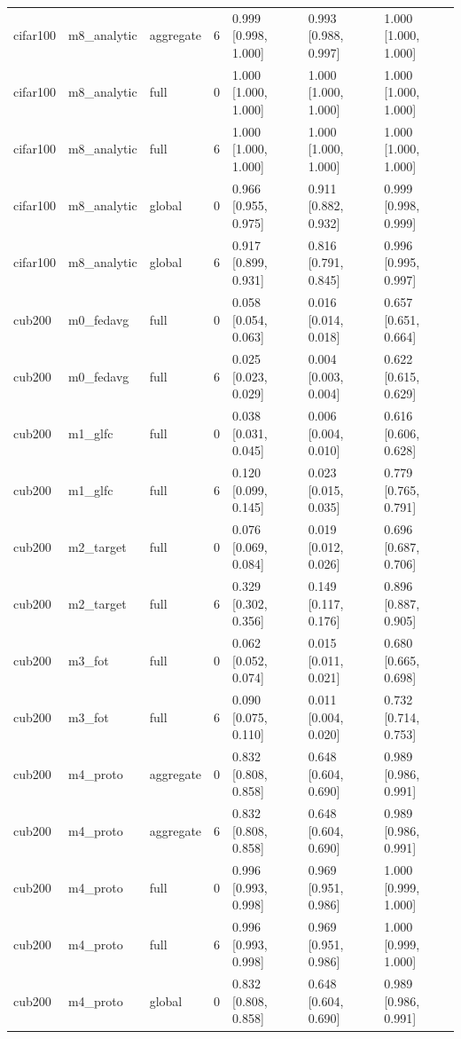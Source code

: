 \begin{tabular}{lllrlll}
cifar100 & m8\_analytic & aggregate & 6 & 0.999 [0.998, 1.000] & 0.993 [0.988, 0.997] & 1.000 [1.000, 1.000] \\
cifar100 & m8\_analytic & full & 0 & 1.000 [1.000, 1.000] & 1.000 [1.000, 1.000] & 1.000 [1.000, 1.000] \\
cifar100 & m8\_analytic & full & 6 & 1.000 [1.000, 1.000] & 1.000 [1.000, 1.000] & 1.000 [1.000, 1.000] \\
cifar100 & m8\_analytic & global & 0 & 0.966 [0.955, 0.975] & 0.911 [0.882, 0.932] & 0.999 [0.998, 0.999] \\
cifar100 & m8\_analytic & global & 6 & 0.917 [0.899, 0.931] & 0.816 [0.791, 0.845] & 0.996 [0.995, 0.997] \\
cub200 & m0\_fedavg & full & 0 & 0.058 [0.054, 0.063] & 0.016 [0.014, 0.018] & 0.657 [0.651, 0.664] \\
cub200 & m0\_fedavg & full & 6 & 0.025 [0.023, 0.029] & 0.004 [0.003, 0.004] & 0.622 [0.615, 0.629] \\
cub200 & m1\_glfc & full & 0 & 0.038 [0.031, 0.045] & 0.006 [0.004, 0.010] & 0.616 [0.606, 0.628] \\
cub200 & m1\_glfc & full & 6 & 0.120 [0.099, 0.145] & 0.023 [0.015, 0.035] & 0.779 [0.765, 0.791] \\
cub200 & m2\_target & full & 0 & 0.076 [0.069, 0.084] & 0.019 [0.012, 0.026] & 0.696 [0.687, 0.706] \\
cub200 & m2\_target & full & 6 & 0.329 [0.302, 0.356] & 0.149 [0.117, 0.176] & 0.896 [0.887, 0.905] \\
cub200 & m3\_fot & full & 0 & 0.062 [0.052, 0.074] & 0.015 [0.011, 0.021] & 0.680 [0.665, 0.698] \\
cub200 & m3\_fot & full & 6 & 0.090 [0.075, 0.110] & 0.011 [0.004, 0.020] & 0.732 [0.714, 0.753] \\
cub200 & m4\_proto & aggregate & 0 & 0.832 [0.808, 0.858] & 0.648 [0.604, 0.690] & 0.989 [0.986, 0.991] \\
cub200 & m4\_proto & aggregate & 6 & 0.832 [0.808, 0.858] & 0.648 [0.604, 0.690] & 0.989 [0.986, 0.991] \\
cub200 & m4\_proto & full & 0 & 0.996 [0.993, 0.998] & 0.969 [0.951, 0.986] & 1.000 [0.999, 1.000] \\
cub200 & m4\_proto & full & 6 & 0.996 [0.993, 0.998] & 0.969 [0.951, 0.986] & 1.000 [0.999, 1.000] \\
cub200 & m4\_proto & global & 0 & 0.832 [0.808, 0.858] & 0.648 [0.604, 0.690] & 0.989 [0.986, 0.991] \\

\end{tabular}
